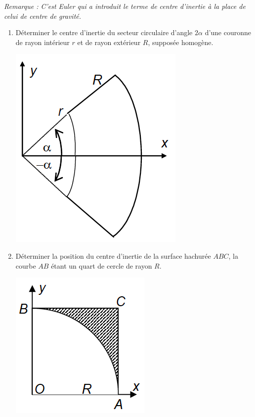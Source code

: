 \textit{Remarque : C'est Euler qui a introduit le terme de centre d'inertie à la place de celui de centre de gravité.}
\begin{enumerate}
\item Déterminer le centre d’inertie du secteur circulaire d’angle $2\alpha$ d’une couronne de rayon intérieur $r$ et de rayon extérieur $R$, supposée homogène.

\begin{center}
\includegraphics[scale=0.5]{png/CI1.png}
\end{center}

\item Déterminer la position du centre d'inertie de la surface hachurée $ABC$, la courbe $AB$ étant un quart de cercle de rayon $R$.

\begin{center}
\includegraphics[scale=0.5]{png/CI2.png}
\end{center}
\end{enumerate}

